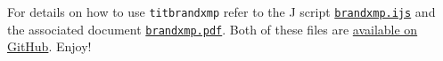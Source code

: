For details on how to use \texttt{titbrandxmp} refer to the J script
\href{https://github.com/bakerjd99/jacks/blob/master/brandxmp/brandxmp.ijs}{\texttt{brandxmp.ijs}}
and the associated document
\href{https://github.com/bakerjd99/jacks/blob/master/brandxmp/brandxmp.pdf}{\texttt{brandxmp.pdf}}.
Both of these files are
\href{https://github.com/bakerjd99/jacks/tree/master/brandxmp}{available
on GitHub}. Enjoy!


%

